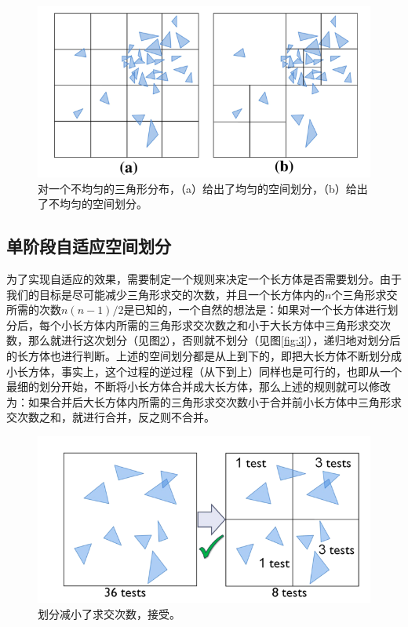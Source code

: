 \documentclass[a4paper,twoside]{article}
\begin{document}
 \begin{figure}[H]
    \centering
    \includegraphics[width=1\linewidth]{png/1.png}
    \caption{对一个不均匀的三角形分布，（a）给出了均匀的空间划分，（b）给出了不均匀的空间划分。}
    \label{fig:1}
  \end{figure}
  

\subsection{单阶段自适应空间划分}
  为了实现自适应的效果，需要制定一个规则来决定一个长方体是否需要划分。由于我们的目标是尽可能减少三角形求交的次数，并且一个长方体内的$n$个三角形求交所需的次数$n(n-1)/2$是已知的，一个自然的想法是：如果对一个长方体进行划分后，每个小长方体内所需的三角形求交次数之和小于大长方体中三角形求交次数，那么就进行这次划分（见图\ref{fig:2}），否则就不划分（见图\ref{fig:3}），递归地对划分后的长方体也进行判断。上述的空间划分都是从上到下的，即把大长方体不断划分成小长方体，事实上，这个过程的逆过程（从下到上）同样也是可行的，也即从一个最细的划分开始，不断将小长方体合并成大长方体，那么上述的规则就可以修改为：如果合并后大长方体内所需的三角形求交次数小于合并前小长方体中三角形求交次数之和，就进行合并，反之则不合并。



\begin{figure}[H]
    \centering
    \includegraphics[width=0.8\linewidth]{png/2.png}
    \caption{划分减小了求交次数，接受。}
    \label{fig:2}
\end{figure}
\end{document}
